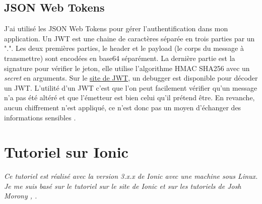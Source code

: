 \documentclass[a4paper, 12pt]{article}
\begin{document}
\subsection{JSON Web Tokens}
J'ai utilisé les JSON Web Tokens pour gérer l'authentification dans mon application. Un JWT est une chaine de
caractères séparée en trois parties par un ".". Les deux premières parties, le header et le payload (le corps du
message à transmettre) sont encodées en base64 séparément. La dernière partie est la signature pour vérifier le jeton,
elle utilise l'algorithme HMAC SHA256 avec un \textit{secret} en arguments. Sur le \href{https://jwt.io/}{site de JWT},
un debugger est disponible pour décoder un JWT. L'utilité d'un JWT c'est que l'on peut facilement vérifier qu'un message
n'a pas été altéré et que l'émetteur est bien celui qu'il prétend être. En revanche, aucun chiffrement n'est appliqué,
ce n'est donc pas un moyen d'échanger des informations sensibles \cite{ref190}.


\section{Tutoriel sur Ionic}
\label{tuto_ionic}
\textit{Ce tutoriel est réalisé avec la version 3.x.x de Ionic avec une machine sous Linux. Je me suis basé sur
le tutoriel sur le site de Ionic \cite{ref0} et sur les tutoriels de Josh Morony \cite{ref10}, \cite{ref20}.}
\end{document}
